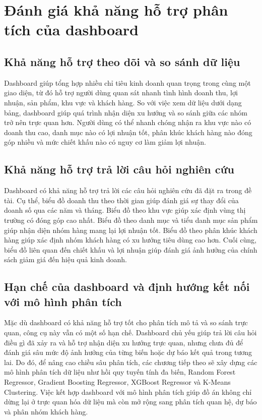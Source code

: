 \section{Đánh giá khả năng hỗ trợ phân tích của dashboard}

\subsection*{\thesubsection\quad Khả năng hỗ trợ theo dõi và so sánh dữ liệu}

Dashboard giúp tổng hợp nhiều chỉ tiêu kinh doanh quan trọng trong cùng một giao diện, từ đó hỗ trợ người dùng quan sát nhanh tình hình doanh thu, lợi nhuận, sản phẩm, khu vực và khách hàng. So với việc xem dữ liệu dưới dạng bảng, dashboard giúp quá trình nhận diện xu hướng và so sánh giữa các nhóm trở nên trực quan hơn. Người dùng có thể nhanh chóng nhận ra khu vực nào có doanh thu cao, danh mục nào có lợi nhuận tốt, phân khúc khách hàng nào đóng góp nhiều và mức chiết khấu nào có nguy cơ làm giảm lợi nhuận.

\subsection*{\thesubsection\quad Khả năng hỗ trợ trả lời câu hỏi nghiên cứu}

Dashboard có khả năng hỗ trợ trả lời các câu hỏi nghiên cứu đã đặt ra trong đề tài. Cụ thể, biểu đồ doanh thu theo thời gian giúp đánh giá sự thay đổi của doanh số qua các năm và tháng. Biểu đồ theo khu vực giúp xác định vùng thị trường có đóng góp cao nhất. Biểu đồ theo danh mục và tiểu danh mục sản phẩm giúp nhận diện nhóm hàng mang lại lợi nhuận tốt. Biểu đồ theo phân khúc khách hàng giúp xác định nhóm khách hàng có xu hướng tiêu dùng cao hơn. Cuối cùng, biểu đồ liên quan đến chiết khấu và lợi nhuận giúp đánh giá ảnh hưởng của chính sách giảm giá đến hiệu quả kinh doanh.

\subsection*{\thesubsection\quad Hạn chế của dashboard và định hướng kết nối với mô hình phân tích}

Mặc dù dashboard có khả năng hỗ trợ tốt cho phân tích mô tả và so sánh trực quan, công cụ này vẫn có một số hạn chế. Dashboard chủ yếu giúp trả lời câu hỏi điều gì đã xảy ra và hỗ trợ nhận diện xu hướng trực quan, nhưng chưa đủ để đánh giá sâu mức độ ảnh hưởng của từng biến hoặc dự báo kết quả trong tương lai. Do đó, để nâng cao chiều sâu phân tích, các chương tiếp theo sẽ xây dựng các mô hình phân tích dữ liệu như hồi quy tuyến tính đa biến, Random Forest Regressor, Gradient Boosting Regressor, XGBoost Regressor và K-Means Clustering. Việc kết hợp dashboard với mô hình phân tích giúp đồ án không chỉ dừng lại ở trực quan hóa dữ liệu mà còn mở rộng sang phân tích quan hệ, dự báo và phân nhóm khách hàng.